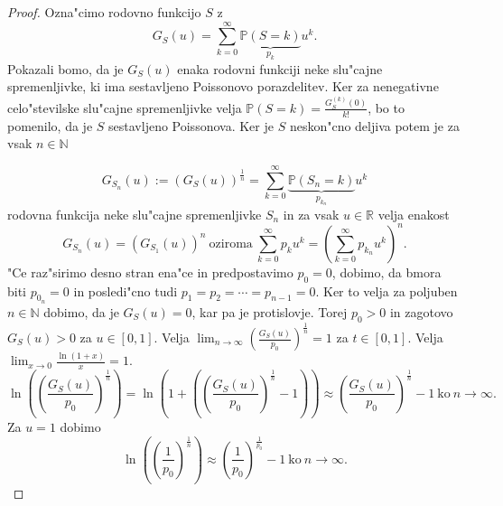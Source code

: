 \documentclass[12pt, a4paper, reqno]{amsart}
\theoremstyle{definition}
\theoremstyle{plain}
\newcommand{\R}{\mathbb{R}}
\newcommand{\N}{\mathbb{N}}
\newcommand{\Prob}{\mathbb{P}}
\newcommand{\1}{\mathds{1}}
\begin{document}
    \begin{proof}
        Ozna"cimo rodovno funkcijo $S$ z 
        \begin{equation*}
            G_S(u) = \sum_{k = 0}^\infty \underbrace{\Prob\left(S = k\right)}_{p_k}u^k.
        \end{equation*} 
        Pokazali bomo, da je $G_S(u)$ enaka rodovni funkciji neke slu"cajne spremenljivke, ki ima sestavljeno
        Poissonovo porazdelitev. Ker za nenegativne celo"stevilske slu"cajne spremenljivke velja 
        $\Prob\left(S = k\right) = \frac{G_S^{(k)}(0)}{k!}$, bo to pomenilo, da je $S$ sestavljeno Poissonova.
        Ker je $S$ neskon"cno deljiva potem je za vsak $n\in\N$ 

        \begin{equation*}
            G_{S_n}(u) := \left(G_S(u)\right)^{\frac{1}{n}} = 
            \sum_{k = 0}^\infty\underbrace{\Prob\left(S_n = k\right)}_{p_{k_n}}u^k
        \end{equation*}
        rodovna funkcija neke slu"cajne spremenljivke $S_n$ in za vsak $u\in\R$ velja enakost
        \begin{equation*}
            G_{S_n}(u) = \left(G_{S_1}(u)\right)^n \ \text{oziroma} \ 
            \sum_{k = 0}^\infty p_{k}u^k = \left(\sum_{k = 0}^\infty p_{k_n}u^k\right)^n.
        \end{equation*}
        "Ce raz"sirimo desno stran ena"ce in predpostavimo $p_0 = 0$, dobimo, da bmora biti 
        $p_{0_n} = 0$ in posledi"cno tudi $p_1 = p_2 = \cdots = p_{n-1} = 0$. Ker to velja za poljuben 
        $n\in\N$ dobimo, da je $G_S(u) = 0$, kar pa je protislovje. Torej $p_0 > 0$ in zagotovo 
        $G_S(u) > 0$ za $u\in[0, 1]$. Velja $\lim_{n\to\infty}\left(\frac{G_S(u)}{p_0}\right)^{\frac{1}{n}} = 1$ za $t\in[0, 1]$.
        Velja $\lim_{x \to 0}\frac{\ln(1 + x)}{x} = 1.$
        \begin{equation*}
            \ln\left(\left(\frac{G_S(u)}{p_0}\right)^{\frac{1}{n}}\right) = \ln\left( 1 + \left(\left(\frac{G_S(u)}{p_0}\right)^{\frac{1}{n}} - 1\right)\right)
            \approx \left(\frac{G_S(u)}{p_0}\right)^{\frac{1}{n}} - 1 \ \text{ko} \ n\to\infty.
        \end{equation*}
        Za $u = 1$ dobimo
        \begin{equation*}
            \ln\left(\left(\frac{1}{p_0}\right)^{\frac{1}{n}}\right) \approx \left(\frac{1}{p_0}\right)^{\frac{1}{p_0}} - 1 \ \text{ko} \ n\to\infty.
        \end{equation*}



        

    \end{proof}
\end{document}
